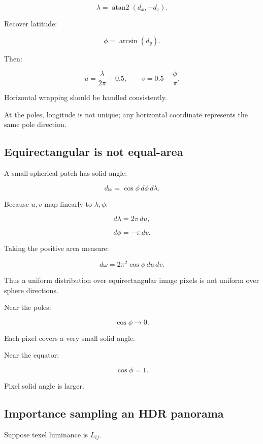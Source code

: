 \[ \boxed{ \lambda=\operatorname{atan2}(d_x,-d_z). } \]

Recover latitude:

\[ \boxed{ \phi=\arcsin(d_y). } \]

Then:

\[ \boxed{ u=\frac{\lambda}{2\pi}+0.5, \qquad v=0.5-\frac{\phi}{\pi}. } \]

Horizontal wrapping should be handled consistently.

At the poles, longitude is not unique; any horizontal coordinate represents the same pole direction.

\subsection{Equirectangular is not equal-area}\label{02-foundations-ii-ch035-equirectangular-is-not-equal-area}

\hypertarget{02-foundations-ii-ch035-equirectangular-is-not-equal-area}{}

A small spherical patch has solid angle:

\[ \boxed{ d\omega=\cos\phi\,d\phi\,d\lambda. } \]

Because \(u,v\) map linearly to \(\lambda,\phi\):

\[ d\lambda=2\pi\,du, \]

\[ d\phi=-\pi\,dv. \]

Taking the positive area measure:

\[ \boxed{ d\omega=2\pi^2\cos\phi\,du\,dv. } \]

Thus a uniform distribution over equirectangular image pixels is not uniform over sphere directions.

Near the poles:

\[ \cos\phi\to0. \]

Each pixel covers a very small solid angle.

Near the equator:

\[ \cos\phi=1. \]

Pixel solid angle is larger.

\subsection{Importance sampling an HDR panorama}\label{02-foundations-ii-ch035-importance-sampling-an-hdr-panorama}

\hypertarget{02-foundations-ii-ch035-importance-sampling-an-hdr-panorama}{}

Suppose texel luminance is \(L_{ij}\).

